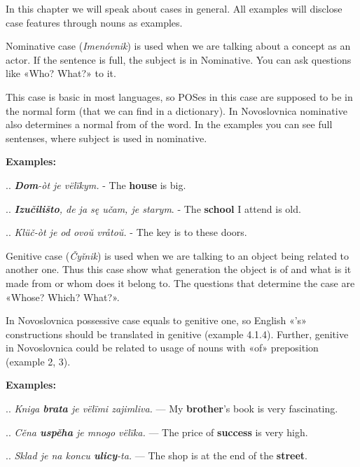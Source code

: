 In this chapter we will speak about cases in general. All examples will disclose case features through nouns as examples.

Nominative case (\textit{Imenóvnik}) is used when we are talking about a concept as an actor. If the sentence is full, the subject is in Nominative. You can ask questions like «Who? What?» to it.

This case is basic in most languages, so POSes in this case are supposed to be in the normal form (that we can find in a dictionary). In Novoslovnica nominative also determines a normal from of the word. In the examples you can see full sentenses, where subject is used in nominative.

\textbf{Examples:}

.. \textit{\textbf{Dom}-òt je vëlïkym.} - The \textbf{house} is big.

.. \textit{\textbf{Izučilišto}, de ja sę učam, je starym}. - The \textbf{school} I attend is old.

.. \textit{Klüč-òt je od ovoŭ vråtoŭ.} - The key is to these doors.

Genitive case (\textit{Čyǐnik}) is used when we are talking to an object being related to another one. Thus this case show what generation the object is of and what is it made from or whom does it belong to. The questions that determine the case are «Whose? Which? What?».

In Novoslovnica possessive case equals to genitive one, so English «'s» constructions should be translated in genitive (example 4.1.4). Further, genitive in Novoslovnica could be related to usage of nouns with «of» preposition (example 2, 3).

\textbf{Examples:}

.. \textit{Kniga \textbf{brata} je vëlïmi zajimliva.} — My \textbf{brother}'s book is very fascinating.

.. \textit{Cěna \textbf{uspěha} je mnogo vëlïka.} — The price of \textbf{success} is very high.

.. \textit{Sklad je na koncu \textbf{ulicy}-ta.} — The shop is at the end of the \textbf{street}.

